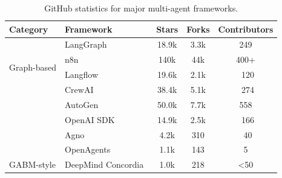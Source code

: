 \begin{table}[t] \centering \scriptsize 
\renewcommand{\arraystretch}{.85}
\caption{GitHub statistics for major multi-agent frameworks.}
\vspace{-1mm}
\label{tab:github-stats-updated} \begin{tabular}{p{1.5cm}p{3.0cm}ccc} \toprule \textbf{Category} & \textbf{Framework} & \textbf{Stars} & \textbf{Forks} & \textbf{Contributors} \\ 
\midrule 
\multirow{4}{*}{Graph-based} 
& LangGraph~\cite{langgraph2025} & 18.9k & 3.3k & 249 \\ 
& n8n~\cite{n8n2025} & 140k & 44k & 400+ \\ 
& Langflow~\cite{langflow2025} & 19.6k & 2.1k & ~120 \\ 
\midrule 
\multirow{4}{*}{Role-based} 
& CrewAI~\cite{crewai2025} & 38.4k & 5.1k & ~274 \\ 
& AutoGen~\cite{wu2024autogen} & 50.0k & 7.7k & 558 \\ 
& OpenAI SDK~\cite{openaiagents2025} & 14.9k & 2.5k & ~166 \\ 
& Agno~\cite{agno2025} & 4.2k & 310 & ~40 \\ 
& OpenAgents~\cite{OpenAgents} & 1.1k & 143 & 5 \\ 
\midrule 
GABM-style 
& DeepMind Concordia~\cite{vezhnevets2023generative} & 1.0k & 218 & <50 \\ 
\bottomrule 
\end{tabular} 
\vspace{-3mm}
\end{table}





